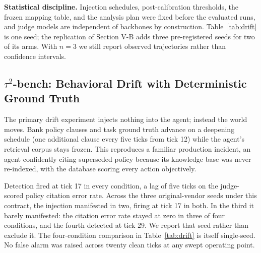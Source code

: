 \documentclass[conference]{IEEEtran}
\begin{document}
\textbf{Statistical discipline.} Injection schedules, post-calibration thresholds, the frozen mapping table, and the analysis plan were fixed before the evaluated runs, and judge models are independent of backbones by construction. Table~\ref{tab:drift} is one seed; the replication of Section V-B adds three pre-registered seeds for two of its arms. With $n = 3$ we still report observed trajectories rather than confidence intervals.

\subsection{$\tau^2$-bench: Behavioral Drift with Deterministic Ground Truth}

The primary drift experiment injects nothing into the agent; instead the world moves. Bank policy clauses and task ground truth advance on a deepening schedule (one additional clause every five ticks from tick 12) while the agent's retrieval corpus stays frozen. This reproduces a familiar production incident, an agent confidently citing superseded policy because its knowledge base was never re-indexed, with the database scoring every action objectively.

Detection fired at tick 17 in every condition, a lag of five ticks on the judge-scored policy citation error rate. Across the three original-vendor seeds under this contract, the injection manifested in two, firing at tick 17 in both. In the third it barely manifested: the citation error rate stayed at zero in three of four conditions, and the fourth detected at tick 29. We report that seed rather than exclude it. The four-condition comparison in Table~\ref{tab:drift} is itself single-seed. No false alarm was raised across twenty clean ticks at any swept operating point.
\end{document}
